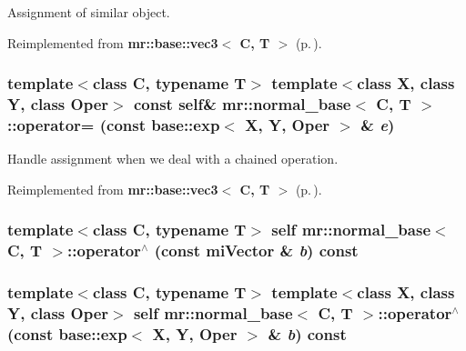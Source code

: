 Assignment of similar object. 



Reimplemented from {\bf mr::base::vec3$<$ C, T $>$} {\rm (p.\,\pageref{structmr_1_1base_1_1vec3_z36_1})}.
\subsubsection{\setlength{\rightskip}{0pt plus 5cm}template$<$class C, typename T$>$ template$<$class X, class Y, class Oper$>$ const {\bf self}\& {\bf mr::normal\_\-base}$<$ C, T $>$::operator= (const {\bf base::exp}$<$ X, Y, Oper $>$ \& {\em e})\hspace{0.3cm}{\tt  [inline]}}\label{structmr_1_1normal__base_z69_0}


Handle assignment when we deal with a chained operation. 



Reimplemented from {\bf mr::base::vec3$<$ C, T $>$} {\rm (p.\,\pageref{structmr_1_1base_1_1vec3_z36_0})}.
\subsubsection{\setlength{\rightskip}{0pt plus 5cm}template$<$class C, typename T$>$ {\bf self} {\bf mr::normal\_\-base}$<$ C, T $>$::operator$^\wedge$ (const mi\-Vector \& {\em b}) const\hspace{0.3cm}{\tt  [inline]}}\label{structmr_1_1normal__base_z73_4}


\subsubsection{\setlength{\rightskip}{0pt plus 5cm}template$<$class C, typename T$>$ template$<$class X, class Y, class Oper$>$ {\bf self} {\bf mr::normal\_\-base}$<$ C, T $>$::operator$^\wedge$ (const {\bf base::exp}$<$ X, Y, Oper $>$ \& {\em b}) const\hspace{0.3cm}{\tt  [inline]}}\label{structmr_1_1normal__base_z73_3}



